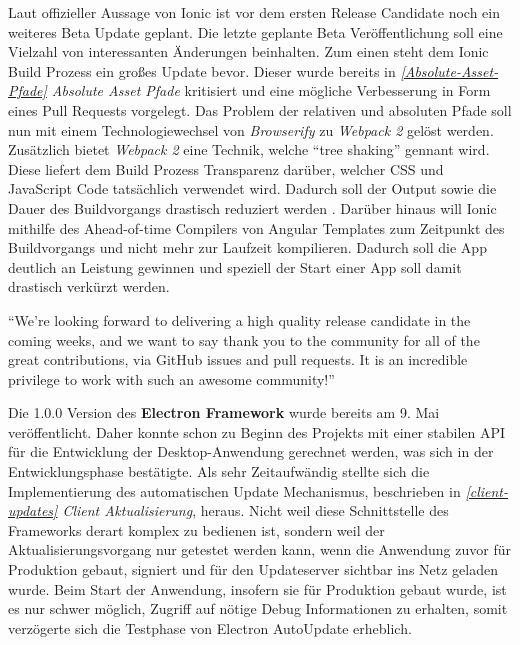 Laut offizieller Aussage von Ionic ist vor dem ersten Release Candidate noch ein weiteres Beta Update geplant.
Die letzte geplante Beta Veröffentlichung soll eine Vielzahl von interessanten
Änderungen beinhalten. Zum einen steht dem Ionic Build Prozess ein großes Update bevor.
Dieser wurde bereits in \emph{\ref{Absolute-Asset-Pfade} Absolute Asset Pfade} kritisiert und eine
mögliche Verbesserung in Form eines Pull Requests vorgelegt.
Das Problem der relativen und absoluten Pfade soll nun mit einem Technologiewechsel von \emph{Browserify} zu \emph{Webpack 2} gelöst werden.
Zusätzlich bietet \emph{Webpack 2} eine Technik, welche ``tree shaking'' gennant wird.
Diese liefert dem Build Prozess Transparenz darüber, welcher \ac{CSS} und JavaScript Code tatsächlich verwendet wird.
Dadurch soll der Output sowie die Dauer des Buildvorgangs drastisch reduziert werden \cite{Annou88:online}.
Darüber hinaus will Ionic mithilfe des Ahead-of-time Compilers von Angular Templates zum Zeitpunkt des Buildvorgangs und nicht mehr zur Laufzeit kompilieren.
Dadurch soll die App deutlich an Leistung gewinnen und speziell der Start einer App soll damit drastisch verkürzt werden.

\vspace{0.3cm}

``We’re looking forward to delivering a high quality release candidate in the coming weeks,
and we want to say thank you to the community for all of the great contributions,
via GitHub issues and pull requests. It is an incredible privilege to work with such an awesome community!'' \cite{Annou88:online}

\vspace{0.3cm}

\noindent
Die 1.0.0 Version des \textbf{Electron Framework} wurde bereits am 9. Mai veröffentlicht.
Daher konnte schon zu Beginn des Projekts \projectname{} mit einer stabilen API für die Entwicklung
der Desktop-Anwendung gerechnet werden, was sich in der Entwicklungsphase bestätigte.
Als sehr Zeitaufwändig stellte sich die Implementierung des automatischen
Update Mechanismus, beschrieben in \emph{\ref{client-updates} Client Aktualisierung}, heraus.
Nicht weil diese Schnittstelle des Frameworks derart komplex zu bedienen ist, sondern weil der Aktualisierungsvorgang nur getestet werden kann,
wenn die Anwendung zuvor für Produktion gebaut, signiert und für den Updateserver sichtbar ins Netz geladen wurde.
Beim Start der Anwendung, insofern sie für Produktion gebaut wurde, ist es nur schwer möglich, Zugriff auf nötige Debug Informationen zu erhalten,
somit verzögerte sich die Testphase von Electron AutoUpdate erheblich.


